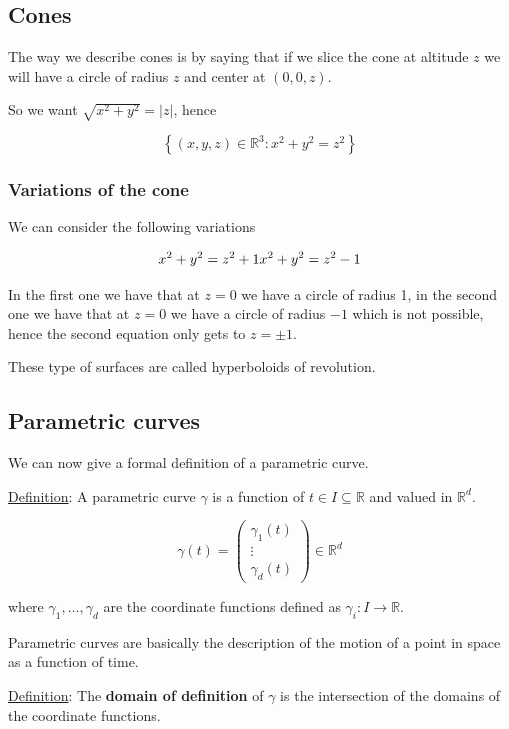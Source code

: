 \documentclass[10pt]{extarticle}
\newcommand{\R}{\mathbb{R}}
\begin{document}
\subsection{Cones}

The way we describe cones is by saying that if we slice the cone at altitude $z$ we will have a circle of radius $z$ and center at $(0,0,z)$.

So we want $\sqrt{x^2 + y^2} = |z|$, hence

$$
    \left\{ (x, y, z) \in \R^3 : x^2 + y^2 = z^2 \right\}
$$

\subsubsection{Variations of the cone}

We can consider the following variations

$$
    x^2 + y^2 = z^2 + 1 \\
    x^2 + y^2 = z^2 - 1
$$

In the first one we have that at $z=0$ we have a circle of radius 1, in the second one we have that at $z=0$ we have a circle of radius $-1$ which is not possible, hence the second equation only gets to $z = \pm 1$.

These type of surfaces are called hyperboloids of revolution.


\subsection{Parametric curves}

We can now give a formal definition of a parametric curve.

\underline{Definition}: A parametric curve $\gamma$ is a function of $t \in I \subseteq \R$ and valued in $\R^d$.

$$
    \gamma(t) = \begin{pmatrix}
        \gamma_1(t) \\
        \vdots      \\
        \gamma_d(t)
    \end{pmatrix} \in \R^d
$$

where $\gamma_1, \ldots, \gamma_d$ are the coordinate functions defined as $\gamma_i: I \to \R$.

Parametric curves are basically the description of the motion of a point in space as a function of time.

\underline{Definition}: The \textbf{domain of definition} of $\gamma$ is the intersection of the domains of the coordinate functions.
\end{document}
